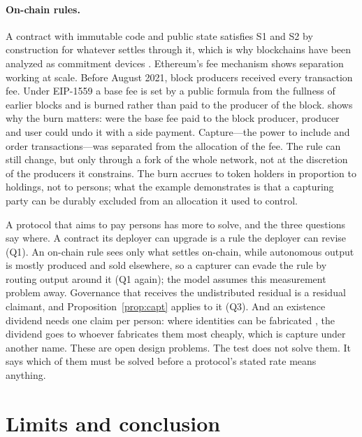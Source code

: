 \paragraph{On-chain rules.} A contract with immutable code and public state satisfies S1
and S2 by construction for whatever settles through it, which is why blockchains have been
analyzed as commitment devices \citep{Szabo1997,CongHe2019,HoldenMalani2019}. Ethereum's fee mechanism shows separation
working at scale. Before August 2021, block producers received every transaction fee.
Under EIP-1559 \citep{Buterin2019} a base fee is set by a public formula from the fullness
of earlier blocks and is burned rather than paid to the producer of the block.
\citet{Roughgarden2021} shows why the burn matters: were the base fee paid to the block
producer, producer and user could undo it with a side payment. Capture---the
power to include and order transactions---was separated from the allocation of the fee.
The rule can still change, but only through a fork of the whole network, not at the
discretion of the producers it constrains. The burn accrues to token holders in proportion
to holdings, not to persons; what the example demonstrates is that a capturing party can
be durably excluded from an allocation it used to control.

A protocol that aims to pay persons has more to solve, and the three questions say where.
A contract its deployer can upgrade is a rule the deployer can revise (Q1). An on-chain
rule sees only what settles on-chain, while autonomous output is mostly produced and sold
elsewhere, so a capturer can evade the rule by routing output around it (Q1 again); the
model assumes this measurement problem away. Governance that receives the undistributed
residual is a residual claimant, and Proposition~\ref{prop:capt} applies to it (Q3). And
an existence dividend needs one claim per person: where identities can be fabricated
\citep{Douceur2002,Borge2017}, the dividend goes to whoever fabricates them most cheaply,
which is capture under another name. These are open design problems. The test does not
solve them. It says which of them must be solved before a protocol's stated rate means
anything.

\section{Limits and conclusion}

